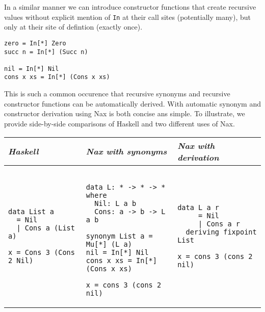 In a similar manner we can introduce constructor functions that create
recursive values without explicit mention of \verb+In+ at their
call sites (potentially many), but only at their site of defintion (exactly once).

{\small
\begin{verbatim}
zero = In[*] Zero
succ n = In[*] (Succ n)

nil = In[*] Nil
cons x xs = In[*] (Cons x xs)
\end{verbatim}}
This is such a common occurence that recursive synonyms and recursive constructor functions
can be automatically derived. With automatic synonym and constructor derivation
using Nax is both concise ans simple. To illustrate, we provide side-by-side comparisons
of Haskell and two different uses of Nax.

\begin{tabular}{l|l|l}
{\em Haskell}  & {\em Nax with synonyms} &  {\em Nax with derivation} \\ \hline
\begin{minipage}[l]{.26\linewidth}
{\small
\begin{verbatim}
data List a 
  = Nil 
  | Cons a (List a)
  
x = Cons 3 (Cons 2 Nil)  
\end{verbatim}}
\end{minipage}

& 

\begin{minipage}[l]{.34\linewidth}
{\small
\begin{verbatim}

data L: * -> * -> * where
  Nil: L a b
  Cons: a -> b -> L a b
  
synonym List a = Mu[*] (L a)
nil = In[*] Nil
cons x xs = In[*] (Cons x xs)

x = cons 3 (cons 2 nil)  
\end{verbatim}}
\end{minipage}

&

\begin{minipage}[l]{.26\linewidth}
{\small
\begin{verbatim}
data L a r 
     = Nil 
     | Cons a r
  deriving fixpoint List

x = cons 3 (cons 2 nil)    
\end{verbatim}}
\end{minipage}

\end{tabular}


